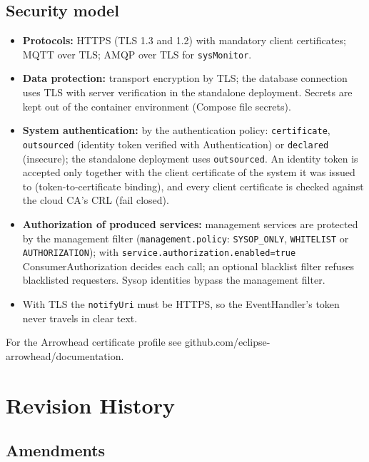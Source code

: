 \documentclass[a4paper]{arrowhead}
\begin{document}
\subsection{Security model}


\begin{itemize}
  \item \textbf{Protocols:} HTTPS (TLS 1.3 and 1.2) with mandatory client certificates; MQTT over TLS; AMQP over TLS for \texttt{sysMonitor}.
  \item \textbf{Data protection:} transport encryption by TLS; the database connection uses TLS with server verification in the standalone deployment. Secrets are kept out of the container environment (Compose file secrets).
  \item \textbf{System authentication:} by the authentication policy: \texttt{certificate}, \texttt{outsourced} (identity token verified with Authentication) or \texttt{declared} (insecure); the standalone deployment uses \texttt{outsourced}. An identity token is accepted only together with the client certificate of the system it was issued to (token-to-certificate binding), and every client certificate is checked against the cloud CA's CRL (fail closed).
  \item \textbf{Authorization of produced services:} management services are protected by the management filter (\texttt{management.policy}: \texttt{SYSOP\_ONLY}, \texttt{WHITELIST} or \texttt{AUTHORIZATION}); with \texttt{service.authorization.enabled=true} ConsumerAuthorization decides each call; an optional blacklist filter refuses blacklisted requesters. Sysop identities bypass the management filter.
  \item With TLS the \texttt{notifyUri} must be HTTPS, so the EventHandler's token never travels in clear text.
\end{itemize}

For the Arrowhead certificate profile see github.com/eclipse-arrowhead/documentation.





\newpage

\section{Revision History}
\subsection{Amendments}
\end{document}
